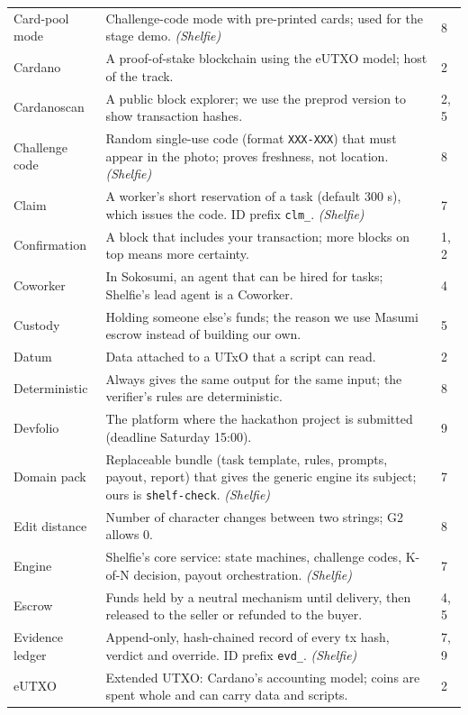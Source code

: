 {\begin{longtable}{@{}p{3.4cm}p{10.6cm}p{1.2cm}@{}}
Card-pool mode & Challenge-code mode with pre-printed cards; used for the stage demo. \emph{(Shelfie)} & 8\\
Cardano & A proof-of-stake blockchain using the eUTXO model; host of the track. & 2\\
Cardanoscan & A public block explorer; we use the preprod version to show transaction hashes. & 2, 5\\
Challenge code & Random single-use code (format \texttt{XXX-XXX}) that must appear in the photo; proves freshness, not location. \emph{(Shelfie)} & 8\\
Claim & A worker's short reservation of a task (default 300 s), which issues the code. ID prefix \texttt{clm\_}. \emph{(Shelfie)} & 7\\
Confirmation & A block that includes your transaction; more blocks on top means more certainty. & 1, 2\\
Coworker & In Sokosumi, an agent that can be hired for tasks; Shelfie's lead agent is a Coworker. & 4\\
Custody & Holding someone else's funds; the reason we use Masumi escrow instead of building our own. & 5\\
Datum & Data attached to a UTxO that a script can read. & 2\\
Deterministic & Always gives the same output for the same input; the verifier's rules are deterministic. & 8\\
Devfolio & The platform where the hackathon project is submitted (deadline Saturday 15:00). & 9\\
Domain pack & Replaceable bundle (task template, rules, prompts, payout, report) that gives the generic engine its subject; ours is \texttt{shelf-check}. \emph{(Shelfie)} & 7\\
Edit distance & Number of character changes between two strings; G2 allows 0. & 8\\
Engine & Shelfie's core service: state machines, challenge codes, K-of-N decision, payout orchestration. \emph{(Shelfie)} & 7\\
Escrow & Funds held by a neutral mechanism until delivery, then released to the seller or refunded to the buyer. & 4, 5\\
Evidence ledger & Append-only, hash-chained record of every tx hash, verdict and override. ID prefix \texttt{evd\_}. \emph{(Shelfie)} & 7, 9\\
eUTXO & Extended UTXO: Cardano's accounting model; coins are spent whole and can carry data and scripts. & 2\\

\end{longtable}}

